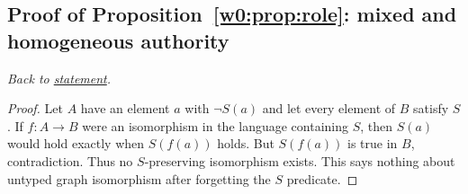 \documentclass[11pt,letterpaper]{article}
\theoremstyle{definition}\newtheorem{definition}[theorem]{Definition}\newtheorem{example}[theorem]{Example}
\theoremstyle{remark}\newtheorem{remark}[theorem]{Remark}
\begin{document}
\subsection{Proof of Proposition~\ref{w0:prop:role}: mixed and homogeneous authority}\label{w0:pr:role}
\textit{Back to \hyperref[w0:prop:role]{statement}.}
\begin{proof}
Let $A$ have an element $a$ with $\neg S(a)$ and let every element of $B$ satisfy $S$. If $f:A\to B$ were an isomorphism in the language containing $S$, then $S(a)$ would hold exactly when $S(f(a))$ holds. But $S(f(a))$ is true in $B$, contradiction. Thus no $S$-preserving isomorphism exists. This says nothing about untyped graph isomorphism after forgetting the $S$ predicate.
\end{proof}
\end{document}
